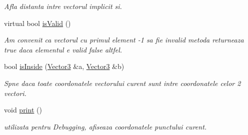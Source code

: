 \begin{DoxyCompactItemize}
\begin{DoxyCompactList}\small\item\em Afla distanta intre vectorul implicit si. \end{DoxyCompactList}\item 
virtual bool \hyperlink{struct_vector3_a065da1e1e6164259fc296a197aa4ea1e}{is\-Valid} ()
\begin{DoxyCompactList}\small\item\em Am convenit ca vectorul cu primul element -\/1 sa fie invalid metoda returneaza true daca elementul e valid false altfel. \end{DoxyCompactList}\item 
bool \hyperlink{struct_vector3_aecd46e467c12a408b98885faaa453c29}{is\-Inside} (\hyperlink{struct_vector3}{Vector3} \&a, \hyperlink{struct_vector3}{Vector3} \&b)
\begin{DoxyCompactList}\small\item\em Spne daca toate coordonatele vectorului curent sunt intre coordonatele celor 2 vectori. \end{DoxyCompactList}\item 
void \hyperlink{struct_vector3_aa2d4b629b2d1260a49a88bd98c48934a}{print} ()
\begin{DoxyCompactList}\small\item\em utilizata pentru Debugging, afiseaza coordonatele punctului curent. \end{DoxyCompactList}\end{DoxyCompactItemize}
